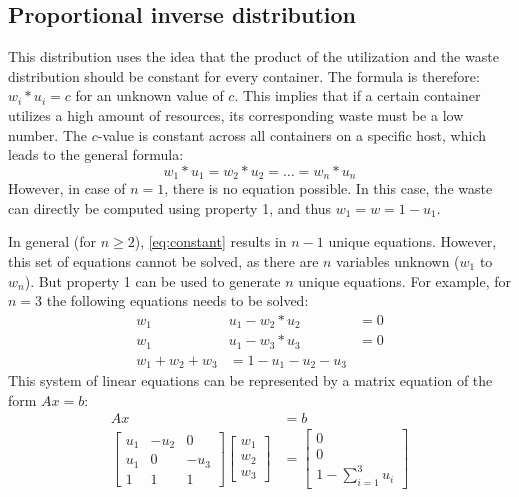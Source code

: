     
\subsection{Proportional inverse distribution} \label{sec:proportional}
This distribution uses the idea that the product of the utilization and the waste distribution should be constant for every container. 
The formula is therefore: $w_i * u_i = c$ for an unknown value of $c$. This implies that if a certain container utilizes a high amount of resources, its corresponding waste must be a low number.
The $c$-value is constant across all containers on a specific host, which leads to the general formula: 
\begin{equation} \label{eq:constant}
    w_1 * u_1 = w_2 * u_2 = \dots = w_n * u_n
\end{equation}
However, in case of $n = 1$, there is no equation possible. In this case, the waste can directly be computed using property 1, and thus $w_1 = w = 1 - u_1$.

In general (for $n \geq 2$), \autoref{eq:constant} results in $n-1$ unique equations. However, this set of equations cannot be solved, as there are $n$ variables unknown ($w_1$ to $w_n$). But property 1 can be used to generate $n$ unique equations. For example, for $n=3$ the following equations needs to be solved:
\begin{equation}\label{eq:linear3}
    \begin{split}
        w_1 & u_1 - w_2 * u_2 &= 0 \\
        w_1 & u_1 - w_3 * u_3 &= 0 \\
        w_1 + w_2 + w_3 &= 1 - u_1 - u_2 - u_3
    \end{split}
\end{equation}
This system of linear equations can be represented by a matrix equation of the form $Ax = b$:
\begin{equation} \label{eq:matrix}
    \begin{split}
        A x &= b\\
        \begin{bmatrix}
        u_1 & -u_2 & 0    \\
        u_1 & 0    & -u_3 \\
        1   & 1    & 1
        \end{bmatrix}
        \begin{bmatrix}
        w_1 \\ w_2 \\ w_3
        \end{bmatrix}
        &= \begin{bmatrix}0 \\ 0 \\ 1 - \sum_{i=1}^3 u_i\end{bmatrix}
    \end{split}
\end{equation}

